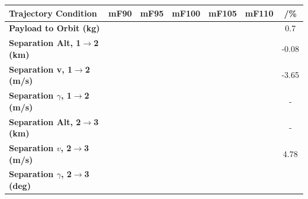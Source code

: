 \begin{table}[ht]
	\centering
\begin{tabular}{l c c c c c c} 
	\hline \textbf{Trajectory Condition}
	&mF90
	&mF95
	&mF100
	&mF105
	&mF110
	& /\%
	\\
	\hline \textbf{Payload to Orbit (kg)}
	& \PayloadToOrbitmFuelNinetyNoReturn
	& \PayloadToOrbitmFuelNinetyFiveNoReturn
	& \PayloadToOrbitmFuelStandardNoReturn
	& \PayloadToOrbitmFuelOneHundredFiveNoReturn
	& \PayloadToOrbitmFuelOneHundredTenNoReturn
	&0.7
	\\
	\textbf{Separation Alt, 1$\rightarrow$2 (km)}
	& \firstsecondSeparationAltmFuelNinetyNoReturn
	& \firstsecondSeparationAltmFuelNinetyFiveNoReturn
	& \firstsecondSeparationAltmFuelStandardNoReturn
	& \firstsecondSeparationAltmFuelOneHundredFiveNoReturn
	& \firstsecondSeparationAltmFuelOneHundredTenNoReturn
	&-0.08
	\\
	\textbf{Separation v, 1$\rightarrow$2 (m/s)}
	& \firstsecondSeparationvmFuelNinetyNoReturn
	& \firstsecondSeparationvmFuelNinetyFiveNoReturn
	& \firstsecondSeparationvmFuelStandardNoReturn
	& \firstsecondSeparationvmFuelOneHundredFiveNoReturn
	& \firstsecondSeparationvmFuelOneHundredTenNoReturn
	&-3.65
	\\
	\textbf{Separation $\gamma$, 1$\rightarrow$2 (m/s)}
	& \firstsecondSeparationgammamFuelNinetyNoReturn
	& \firstsecondSeparationgammamFuelNinetyFiveNoReturn
	& \firstsecondSeparationgammamFuelStandardNoReturn
	& \firstsecondSeparationgammamFuelOneHundredFiveNoReturn
	& \firstsecondSeparationgammamFuelOneHundredTenNoReturn
	& -
	\\
	\textbf{Separation Alt, 2$\rightarrow$3 (km)}
	& \secondthirdSeparationAltmFuelNinetyNoReturn
	& \secondthirdSeparationAltmFuelNinetyFiveNoReturn
	& \secondthirdSeparationAltmFuelStandardNoReturn
	& \secondthirdSeparationAltmFuelOneHundredFiveNoReturn
	& \secondthirdSeparationAltmFuelOneHundredTenNoReturn
	& -
	\\
	\textbf{Separation $v$, 2$\rightarrow$3 (m/s)}
	& \secondthirdSeparationvmFuelNinetyNoReturn
	& \secondthirdSeparationvmFuelNinetyFiveNoReturn
	& \secondthirdSeparationvmFuelStandardNoReturn
	& \secondthirdSeparationvmFuelOneHundredFiveNoReturn
	& \secondthirdSeparationvmFuelOneHundredTenNoReturn
	&4.78
	\\
	\textbf{Separation $\gamma$, 2$\rightarrow$3 (deg)}
	& \secondthirdSeparationgammamFuelNinetyNoReturn
	& \secondthirdSeparationgammamFuelNinetyFiveNoReturn
	& \secondthirdSeparationgammamFuelStandardNoReturn
	& \secondthirdSeparationgammamFuelOneHundredFiveNoReturn

\end{tabular}
\end{table}
